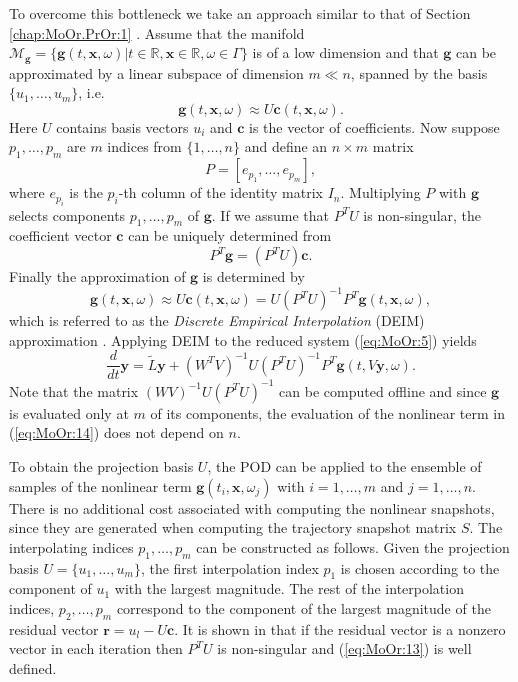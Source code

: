 To overcome this bottleneck we take an approach similar to that of Section \ref{chap:MoOr.PrOr:1} \cite{Chaturantabut:2010cz,Barrault:2004kz}. Assume that the manifold $\mathcal M_{\mathbf g} = \{ \mathbf g(t,\mathbf x , \omega)| t\in \mathbb R, \mathbf x \in \mathbb R , \omega \in \Gamma\}$ is of a low dimension and that $\mathbf g$ can be approximated by a linear subspace of dimension $m\ll n$, spanned by the basis $\{ u_1 , \dots , u_m \}$, i.e.
\begin{equation} \label{eq:MoOr:10}
	\mathbf g(t,\mathbf x,\omega) \approx U \mathbf c(t,\mathbf x,\omega).
\end{equation}
Here $U$ contains basis vectors $u_i$ and $\mathbf c$ is the vector of coefficients. Now suppose $p_1,\dots,p_m$ are $m$ indices from $\{1,\dots,n\}$ and define an $n\times m$ matrix
\begin{equation} \label{eq:MoOr:11}
	P = [e_{p_1},\dots,e_{p_m}],
\end{equation}
where $e_{p_i}$ is the $p_i$-th column of the identity matrix $I_n$. Multiplying $P$ with $\mathbf g$ selects components $p_1,\dots,p_m$ of $\mathbf g$. If we assume that $P^TU$ is non-singular, the coefficient vector $\mathbf c$ can be uniquely determined from
\begin{equation} \label{eq:MoOr:12}
	P^T \mathbf g = (P^TU)\mathbf c.
\end{equation}
Finally the approximation of $\mathbf g$ is determined by
\begin{equation} \label{eq:MoOr:13}
	\mathbf g(t,\mathbf x,\omega) \approx U \mathbf c(t,\mathbf x,\omega) = U (P^TU)^{-1} P^T \mathbf g(t,\mathbf x,\omega),
\end{equation}
which is referred to as the \emph{Discrete Empirical Interpolation} (DEIM) approximation \cite{Chaturantabut:2010cz}. Applying DEIM to the reduced system (\ref{eq:MoOr:5}) yields
\begin{equation} \label{eq:MoOr:14}
	\frac{d}{dt} \mathbf y = \tilde L \mathbf y + (W^TV)^{-1} U(P^TU)^{-1}P^T \mathbf g(t,V\mathbf y , \omega).
\end{equation}
Note that the matrix $(WV)^{-1} U(P^TU)^{-1}$ can be computed offline and since $\mathbf g$ is evaluated only at $m$ of its components, the evaluation of the nonlinear term in (\ref{eq:MoOr:14}) does not depend on $n$.

To obtain the projection basis $U$, the POD can be applied to the ensemble of samples of the nonlinear term $\mathbf g(t_i,\mathbf x, \omega_j)$ with $i=1,\dots,m$ and $j=1,\dots,n$. There is no additional cost associated with computing the nonlinear snapshots, since they are generated when computing the trajectory snapshot matrix $S$. The interpolating indices $p_1,\dots,p_m$ can be constructed as follows. Given the projection basis $U = \{u_1,\dots,u_m\}$, the first interpolation index $p_1$ is chosen according to the component of $u_1$ with the largest magnitude. The rest of the interpolation indices, $p_2,\dots,p_m$ correspond to the component of the largest magnitude of the residual vector $\mathbf r = u_l - U \mathbf c$. It is shown in \cite{Chaturantabut:2010cz} that if the residual vector is a nonzero vector in each iteration then $P^TU$ is non-singular and (\ref{eq:MoOr:13}) is well defined. 


